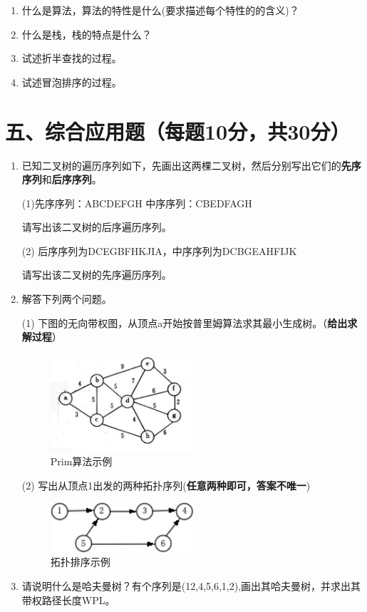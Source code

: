 \documentclass{../../note}
\begin{document}
\begin{enumerate}
\item 什么是算法，算法的特性是什么(要求描述每个特性的的含义)？

\item 什么是栈，栈的特点是什么？

\item 试述折半查找的过程。

\item 试述冒泡排序的过程。
\end{enumerate}

\vspace{1cm}


\section*{五、综合应用题（每题10分，共30分）}

\begin{enumerate}
\item 已知二叉树的遍历序列如下，先画出这两棵二叉树，然后分别写出它们的\textbf{先序序列}和\textbf{后序序列}。

(1)先序序列：ABCDEFGH 中序序列：CBEDFAGH

请写出该二叉树的后序遍历序列。

(2) 后序序列为DCEGBFHKJIA，中序序列为DCBGEAHFIJK

请写出该二叉树的先序遍历序列。

\item 解答下列两个问题。

(1) 下图的无向带权图，从顶点a开始按普里姆算法求其最小生成树。（\textbf{给出求解过程}）

\begin{figure}[h]
\centering
\includegraphics[width=0.5\textwidth]{./graph.png}
\caption{Prim算法示例}
\end{figure}

(2) 写出从顶点1出发的两种拓扑序列(\textbf{任意两种即可，答案不唯一})

\begin{figure}[h]
\centering
\includegraphics[width=0.5\textwidth]{./graph_tree.png}
\caption{拓扑排序示例}
\end{figure}

\item 请说明什么是哈夫曼树？有个序列是(12,4,5,6,1,2),画出其哈夫曼树，并求出其带权路径长度WPL。
\end{enumerate}

\vspace{1cm}
\end{document}
